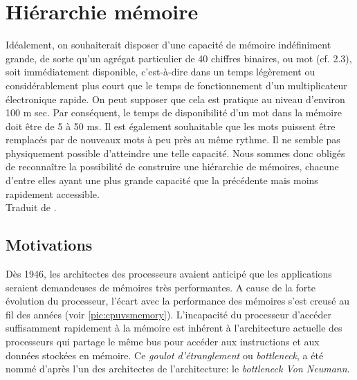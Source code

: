 \section{Hiérarchie mémoire} \label{sec:hierarchie}

\begin{fancyquotes}
Idéalement, on souhaiterait disposer d'une capacité de mémoire indéfiniment grande, de sorte qu'un agrégat particulier de 40 chiffres binaires, ou mot (cf. 2.3), soit immédiatement disponible, c'est-à-dire dans un temps légèrement ou considérablement plus court que le temps de fonctionnement d'un multiplicateur électronique rapide. On peut supposer que cela est pratique au niveau d'environ 100 m sec. Par conséquent, le temps de disponibilité d'un mot dans la mémoire doit être de 5 à 50 ms. Il est également souhaitable que les mots puissent être remplacés par de nouveaux mots à peu près au même rythme. Il ne semble pas physiquement possible d'atteindre une telle capacité. Nous sommes donc obligés de reconnaître la possibilité de construire une hiérarchie de mémoires, chacune d'entre elles ayant une plus grande capacité que la précédente mais moins rapidement accessible.\\
Traduit de \cite{burks1946preliminary}.

\end{fancyquotes}


\subsection{Motivations}


Dès 1946, les architectes des processeurs avaient anticipé que les applications seraient demandeuses de mémoires très performantes. A cause de la forte évolution du processeur, l'écart avec la performance des mémoires s'est creusé au fil des années (voir \autoref{pic:cpuvsmemory}). L'incapacité du processeur d'accéder suffisamment rapidement à la mémoire est inhérent à l'architecture actuelle des processeurs qui partage le même bus pour accéder aux instructions et aux données stockées en mémoire. Ce \textit{goulot d'étranglement} ou \textit{bottleneck}, a été nommé d'après l'un des architectes de l'architecture: le \textit{bottleneck Von Neumann}.


